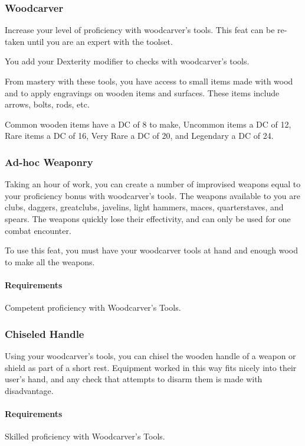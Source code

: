 \subsubsection{Woodcarver} \label{feat::woodcarver}
    Increase your level of proficiency with woodcarver's tools.
    This feat can be re-taken until you are an expert with the toolset.

    You add your Dexterity modifier to checks with woodcarver's tools.

    From mastery with these tools, you have access to small items made with wood and to apply engravings on wooden items and surfaces.
    These items include arrows, bolts, rods, etc.

    Common wooden items have a DC of 8 to make, Uncommon items a DC of 12, Rare items a DC of 16, Very Rare a DC of 20, and Legendary a DC of 24.
\subsubsection{Ad-hoc Weaponry} \label{feat::adhocweaponry}
    Taking an hour of work, you can create a number of improvised weapons equal to your proficiency bonus with woodcarver's tools.
    The weapons available to you are clubs, daggers, greatclubs, javelins, light hammers, maces, quarterstaves, and spears.
    The weapons quickly lose their effectivity, and can only be used for one combat encounter.

    To use this feat, you must have your woodcarver tools at hand and enough wood to make all the weapons.
    \paragraph{Requirements} Competent proficiency with Woodcarver's Tools.
\subsubsection{Chiseled Handle} \label{feat::chiseledhandle}
    Using your woodcarver's tools, you can chisel the wooden handle of a weapon or shield as part of a short rest.
    Equipment worked in this way fits nicely into their user's hand, and any check that attempts to disarm them is made with disadvantage.
    \paragraph{Requirements} Skilled proficiency with Woodcarver's Tools.
